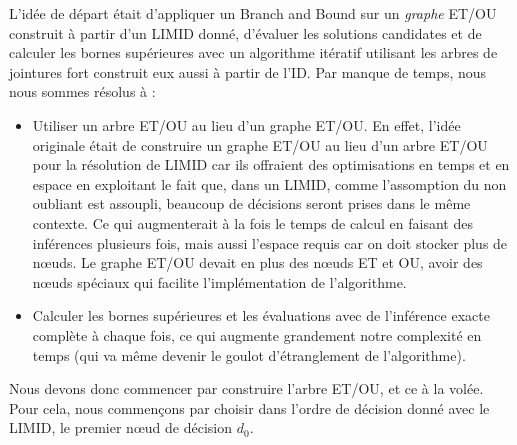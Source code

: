 \documentclass[12pt]{article}
\begin{document}
L'idée de départ était d'appliquer un Branch and Bound sur un \textit{graphe} ET/OU construit à partir d'un LIMID donné, d'évaluer les solutions candidates et de calculer les bornes supérieures avec un algorithme itératif utilisant les arbres de jointures fort construit eux aussi à partir de l'ID. 
\bigbreak
Par manque de temps, nous nous sommes résolus à :
\begin{itemize}
    \item Utiliser un arbre ET/OU au lieu d'un graphe ET/OU. En effet, l'idée originale était de construire un graphe ET/OU au lieu d'un arbre ET/OU pour la résolution de LIMID car ils offraient des optimisations en temps et en espace en exploitant le fait que, dans un LIMID, comme l'assomption du non oubliant est assoupli, beaucoup de décisions seront prises dans le même contexte. Ce qui augmenterait à la fois le temps de calcul en faisant des inférences plusieurs fois, mais aussi l'espace requis car on doit stocker plus de nœuds. Le graphe ET/OU devait en plus des nœuds ET et OU, avoir des nœuds spéciaux qui facilite l'implémentation de l'algorithme.
    \item Calculer les bornes supérieures et les évaluations avec de l'inférence exacte complète à chaque fois, ce qui augmente grandement notre complexité en temps (qui va même devenir le goulot d'étranglement de l'algorithme).
\end{itemize}

Nous devons donc commencer par construire l'arbre ET/OU, et ce à la volée. Pour cela, nous commençons par choisir dans l'ordre de décision donné avec le LIMID, le premier nœud de décision $d_0$.
\end{document}
